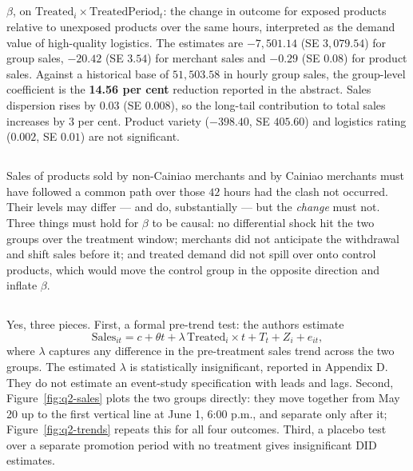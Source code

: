 \documentclass[11pt]{article}
\begin{document}
\subsection{}
$\beta$, on $\text{Treated}_i \times \text{TreatedPeriod}_t$: the change in
outcome for exposed products relative to unexposed products over the same
hours, interpreted as the demand value of high-quality logistics. The estimates
are $-7{,}501.14$ (SE $3{,}079.54$) for group sales,
$-20.42$ (SE $3.54$) for merchant sales and $-0.29$ (SE $0.08$) for product
sales. Against a historical base of $51{,}503.58$ in hourly group sales, the
group-level coefficient is the \textbf{14.56 per cent} reduction reported in
the abstract. Sales dispersion rises by $0.03$ (SE $0.008$), so the
long-tail contribution to total sales increases by $3$ per cent. Product
variety ($-398.40$, SE $405.60$) and logistics rating ($0.002$, SE $0.01$) are
not significant.

\subsection{}
Sales of products sold by non-Cainiao merchants and by Cainiao merchants must
have followed a common path over those $42$ hours had the clash not occurred.
Their levels may differ --- and do, substantially --- but the \emph{change}
must not. Three things must hold for $\beta$ to be causal: no differential
shock hit the two groups over the treatment window; merchants did not
anticipate the withdrawal and shift sales before it; and treated demand did not
spill over onto control products, which would move the control group in the
opposite direction and inflate $\beta$.

\subsection{}
Yes, three pieces. First, a formal pre-trend test: the authors estimate
\[
\text{Sales}_{it} = c + \theta t + \lambda\,\text{Treated}_i \times t
 + T_t + Z_i + e_{it},
\]
where $\lambda$ captures any difference in the pre-treatment sales trend across
the two groups. The estimated $\lambda$ is statistically insignificant,
reported in Appendix D. They do not estimate an event-study specification with
leads and lags. Second, Figure~\ref{fig:q2-sales} plots the two groups
directly: they move together from May 20 up to the first vertical line at
June 1, 6:00 p.m., and separate only after it; Figure~\ref{fig:q2-trends}
repeats this for all four outcomes. Third, a placebo test over a separate
promotion period with no treatment gives insignificant DID estimates.
\end{document}
